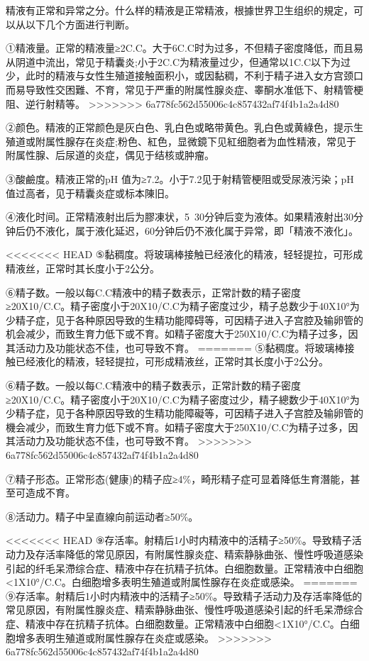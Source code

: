 \documentclass[12pt,UTF8]{ctexbook}
\begin{document}
精液有正常和异常之分。什么样的精液是正常精液，根據世界卫生组织的規定，可以从以下几个方面进行判断。

①精液量。正常的精液量≥2C.C。大于6C.C时为过多，不但精子密度降低，而且易从阴道中流出，常见于精囊炎;小于2C.C为精液量过少，但通常以1C.C以下为过少，此时的精液与女性生殖道接触面积小，或因黏稠，不利于精子进入女方宫颈口而易导致性交困難、不育，常见于严重的附属性腺炎症、睾酮水准低下、射精管梗阻、逆行射精等。
>>>>>>> 6a778fc562d55006c4c857432af74f4b1a2a4d80

②颜色。精液的正常颜色是灰白色、乳白色或略带黄色。乳白色或黄綠色，提示生殖道或附属性腺存在炎症;粉色、紅色，显微鏡下见紅细胞者为血性精液，常见于附属性腺、后尿道的炎症，偶见于结核或肿瘤。

③酸鹼度。精液正常的pH 值为≥7.2。小于7.2见于射精管梗阻或受尿液污染；pH值过高者，见于精囊炎症或标本陳旧。

④液化时间。正常精液射出后为膠凍状，5~30分钟后变为液体。如果精液射出30分钟后仍不液化，属于液化延迟，60分钟后仍不液化属于异常，即「精液不液化」。

<<<<<<< HEAD
⑤黏稠度。将玻璃棒接触已经液化的精液，轻轻提拉，可形成精液丝，正常时其长度小于2公分。

⑥精子数。一般以每C.C精液中的精子数表示，正常計数的精子密度≥20X10/C.C。精子密度小于20X10/C.C为精子密度过少，精子总数少于40X10°为少精子症，见于各种原因导致的生精功能障碍等，可因精子进入子宫腔及输卵管的机会减少，而致生育力低下或不育。如精子密度大于250X10/C.C为精子过多，因其活动力及功能状态不佳，也可导致不育。
=======
⑤黏稠度。将玻璃棒接触已经液化的精液，轻轻提拉，可形成精液丝，正常时其长度小于2公分。

⑥精子数。一般以每C.C精液中的精子数表示，正常計数的精子密度≥20X10/C.C。精子密度小于20X10/C.C为精子密度过少，精子總数少于40X10°为少精子症，见于各种原因导致的生精功能障礙等，可因精子进入子宫腔及输卵管的機会减少，而致生育力低下或不育。如精子密度大于250X10/C.C为精子过多，因其活动力及功能状态不佳，也可导致不育。
>>>>>>> 6a778fc562d55006c4c857432af74f4b1a2a4d80

⑦精子形态。正常形态(健康)的精子应≥4\%，畸形精子症可显着降低生育潛能，甚至可造成不育。

⑧活动力。精子中呈直線向前运动者≥50\%。

<<<<<<< HEAD
⑨存活率。射精后1小时内精液中的活精子≥50\%。导致精子活动力及存活率降低的常见原因，有附属性腺炎症、精索静脉曲张、慢性呼吸道感染引起的纤毛呆滯综合症、精液中存在抗精子抗体。白细胞数量。正常精液中白细胞<1X10°/C.C。白细胞增多表明生殖道或附属性腺存在炎症或感染。
=======
⑨存活率。射精后1小时内精液中的活精子≥50\%。导致精子活动力及存活率降低的常见原因，有附属性腺炎症、精索静脉曲张、慢性呼吸道感染引起的纤毛呆滯综合症、精液中存在抗精子抗体。白细胞数量。正常精液中白细胞<1X10°/C.C。白细胞增多表明生殖道或附属性腺存在炎症或感染。
>>>>>>> 6a778fc562d55006c4c857432af74f4b1a2a4d80
\end{document}
